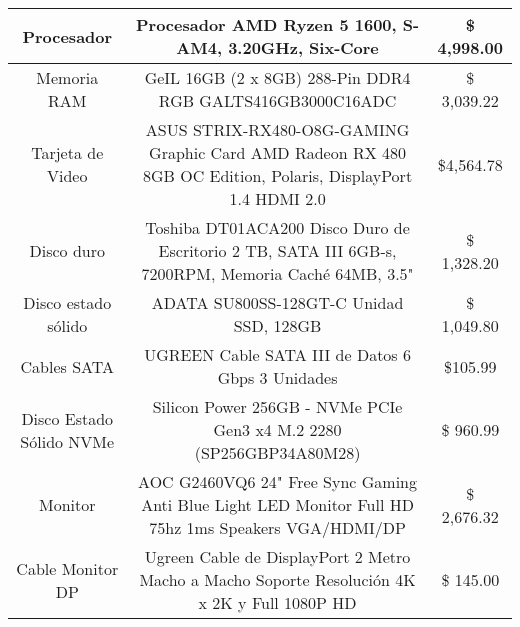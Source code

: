 \begin{table}[]
\begin{tabular}{c|c|c|}
\multicolumn{1}{|c|}{Procesador}                                & {\color[HTML]{000000} Procesador AMD Ryzen 5 1600, S-AM4, 3.20GHz, Six-Core}                                                                               & \$ 4,998.00     \\ \hline
\multicolumn{1}{|c|}{Memoria RAM}                               & {\color[HTML]{000000} GeIL 16GB (2 x 8GB) 288-Pin DDR4 RGB GALTS416GB3000C16ADC}                                                                           & \$ 3,039.22     \\ \hline
\multicolumn{1}{|c|}{Tarjeta de Video}                          & {\color[HTML]{000000} ASUS STRIX-RX480-O8G-GAMING Graphic Card AMD Radeon RX 480 8GB OC Edition, Polaris, DisplayPort 1.4 HDMI 2.0}                        & \$4,564.78      \\ \hline
\multicolumn{1}{|c|}{Disco duro}                                & {\color[HTML]{000000} Toshiba DT01ACA200 Disco Duro de Escritorio 2 TB, SATA III 6GB-s, 7200RPM, Memoria Caché 64MB, 3.5"}                                 & \$ 1,328.20     \\ \hline
\multicolumn{1}{|c|}{Disco estado sólido}                       & {\color[HTML]{000000} ADATA SU800SS-128GT-C Unidad SSD, 128GB}                                                                                             & \$ 1,049.80     \\ \hline
\multicolumn{1}{|c|}{Cables SATA}                               & {\color[HTML]{000000} UGREEN Cable SATA III de Datos 6 Gbps 3 Unidades}                                                                                    & \$105.99        \\ \hline
\multicolumn{1}{|c|}{Disco Estado Sólido NVMe}                  & {\color[HTML]{000000} Silicon Power 256GB - NVMe PCIe Gen3 x4 M.2 2280 (SP256GBP34A80M28)}                                                                 & \$ 960.99       \\ \hline
\multicolumn{1}{|c|}{Monitor}                                   & {\color[HTML]{000000} AOC G2460VQ6 24" Free Sync Gaming Anti Blue Light LED Monitor Full HD 75hz 1ms Speakers VGA/HDMI/DP}                                 & \$ 2,676.32     \\ \hline
\multicolumn{1}{|c|}{Cable Monitor DP}                          & {\color[HTML]{000000} Ugreen Cable de DisplayPort 2 Metro Macho a Macho Soporte Resolución 4K x 2K y Full 1080P HD}                                        & \$ 145.00       \\ \hline

\end{tabular}
\end{table}
